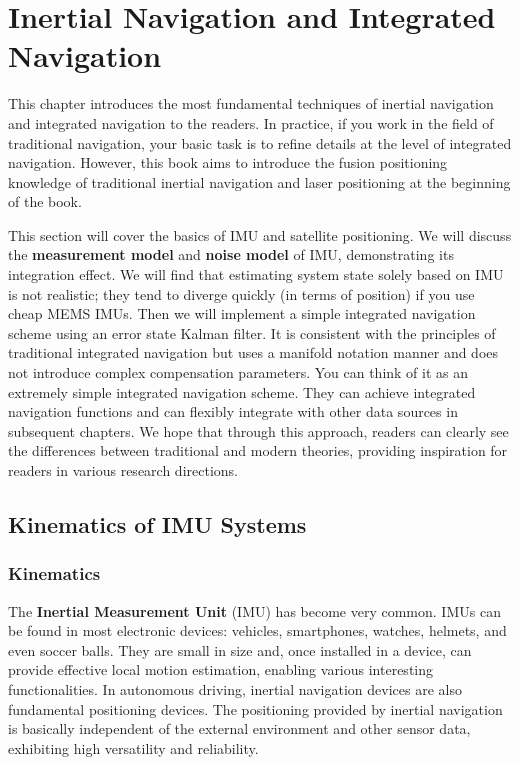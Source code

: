 \chapter{Inertial Navigation and Integrated Navigation}
\label{cpt:ins}
\thispagestyle{empty}
This chapter introduces the most fundamental techniques of inertial navigation and integrated navigation to the readers. In practice, if you work in the field of traditional navigation, your basic task is to refine details at the level of integrated navigation. However, this book aims to introduce the fusion positioning knowledge of traditional inertial navigation and laser positioning at the beginning of the book.

This section will cover the basics of IMU and satellite positioning. We will discuss the \textbf{measurement model} and \textbf{noise model} of IMU, demonstrating its integration effect. We will find that estimating system state solely based on IMU is not realistic; they tend to diverge quickly (in terms of position) if you use cheap MEMS IMUs. Then we will implement a simple integrated navigation scheme using an error state Kalman filter. It is consistent with the principles of traditional integrated navigation but uses a manifold notation manner and does not introduce complex compensation parameters. You can think of it as an extremely simple integrated navigation scheme. They can achieve integrated navigation functions and can flexibly integrate with other data sources in subsequent chapters. We hope that through this approach, readers can clearly see the differences between traditional and modern theories, providing inspiration for readers in various research directions.



\section{Kinematics of IMU Systems}
\label{sec:imu-kinematic}
\subsection{Kinematics}
The \textbf{Inertial Measurement Unit} (IMU) has become very common. IMUs can be found in most electronic devices: vehicles, smartphones, watches, helmets, and even soccer balls. They are small in size and, once installed in a device, can provide effective local motion estimation, enabling various interesting functionalities. In autonomous driving, inertial navigation devices are also fundamental positioning devices. The positioning provided by inertial navigation is basically independent of the external environment and other sensor data, exhibiting high versatility and reliability.

